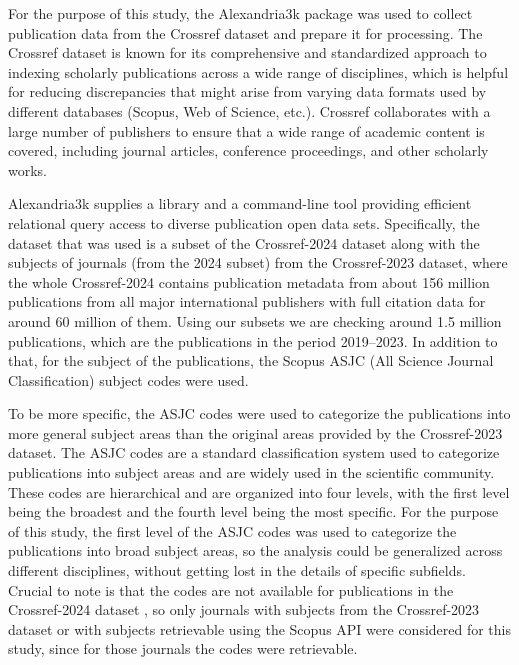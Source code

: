 For the purpose of this study, the Alexandria3k \cite{Spi23g} package was used
to collect publication data from the Crossref dataset \cite{Crossref2020} and
prepare it for processing. The Crossref dataset is known for its comprehensive
and standardized approach to indexing scholarly publications across a wide
range of disciplines, which is helpful for reducing discrepancies that might
arise from varying data formats used by different databases (Scopus, Web of
Science, etc.). Crossref collaborates with a large number of publishers to
ensure that a wide range of academic content is covered, including journal
articles, conference proceedings, and other scholarly works.

Alexandria3k supplies a library and a command-line tool providing efficient
relational query access to diverse publication open data sets. Specifically,
the dataset that was used is a subset of the Crossref-2024 dataset along with
the subjects of journals (from the 2024 subset) from the Crossref-2023 dataset,
where the whole Crossref-2024 contains publication metadata from about 156
million publications from all major international publishers with full citation
data for around 60 million of them. Using our subsets we are checking around
1.5 million publications, which are the publications in the period 2019--2023.
In addition to that, for the subject of the publications, the Scopus ASJC (All
Science Journal Classification) subject codes were used.

To be more specific, the ASJC codes were used to categorize the publications
into more general subject areas than the original areas provided by the
Crossref-2023 dataset. The ASJC codes are a standard classification system used
to categorize publications into subject areas and are widely used in the
scientific community. These codes are hierarchical and are organized into four
levels, with the first level being the broadest and the fourth level being the
most specific. For the purpose of this study, the first level of the ASJC codes
was used to categorize the publications into broad subject areas, so the
analysis could be generalized across different disciplines, without getting
lost in the details of specific subfields. Crucial to note is that the codes
are not available for publications in the Crossref-2024 dataset
\cite{crossrefSubjectCodes2024}, so only journals with subjects from the
Crossref-2023 dataset or with subjects retrievable using the Scopus API
\cite{elsevier_dev_portal} were considered for this study, since for those
journals the codes were retrievable.

